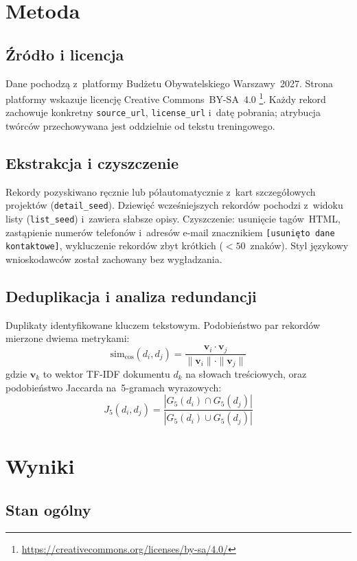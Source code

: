 \section{Metoda}

\subsection*{Źródło i licencja}
Dane pochodzą z~platformy Budżetu Obywatelskiego Warszawy~2027.
Strona platformy wskazuje licencję Creative Commons~BY-SA~4.0%
\footnote{\url{https://creativecommons.org/licenses/by-sa/4.0/}}.
Każdy rekord zachowuje konkretny \texttt{source\_url},
\texttt{license\_url} i~datę pobrania; atrybucja twórców przechowywana
jest oddzielnie od tekstu treningowego.

\subsection*{Ekstrakcja i czyszczenie}
Rekordy pozyskiwano ręcznie lub półautomatycznie z~kart szczegółowych
projektów (\texttt{detail\_seed}). Dziewięć wcześniejszych rekordów
pochodzi z~widoku listy (\texttt{list\_seed}) i~zawiera słabsze opisy.
Czyszczenie: usunięcie tagów~HTML, zastąpienie numerów telefonów
i~adresów e-mail znacznikiem \texttt{[usunięto dane kontaktowe]},
wykluczenie rekordów zbyt krótkich ($< 50$~znaków). Styl językowy
wnioskodawców został zachowany bez wygładzania.

\subsection*{Deduplikacja i analiza redundancji}
Duplikaty identyfikowane kluczem tekstowym. Podobieństwo par rekordów
mierzone dwiema metrykami:
\[
  \mathrm{sim}_{\cos}(d_i, d_j)
    = \frac{\mathbf{v}_i \cdot \mathbf{v}_j}
           {\|\mathbf{v}_i\| \cdot \|\mathbf{v}_j\|}
\]
gdzie $\mathbf{v}_k$ to wektor TF-IDF dokumentu $d_k$ na słowach
treściowych, oraz podobieństwo Jaccarda na~5-gramach wyrazowych:
\[
  J_5(d_i, d_j)
    = \frac{|G_5(d_i) \cap G_5(d_j)|}
           {|G_5(d_i) \cup G_5(d_j)|}
\]

\section{Wyniki}

\subsection*{Stan ogólny}

